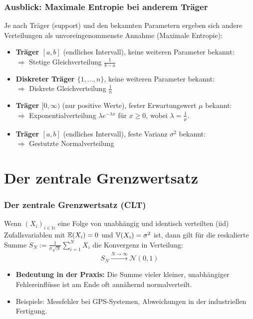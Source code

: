 \begin{frame}
  \frametitle{Ausblick: Maximale Entropie bei anderem Träger}
  Je nach Träger (support) und den bekannten Parametern ergeben sich andere Verteilungen als \alert{unvoreingenommenste Annahme} (Maximale Entropie):
  
  \vspace{0.3cm}
  \begin{itemize}[<+->]
    \item \textbf{Träger $[a,b]$} (endliches Intervall), keine weiteren Parameter bekannt:\\
    $\Rightarrow$ \alert{Stetige Gleichverteilung} $\frac{1}{b-a}$
    
    \vspace{0.2cm}
    \item \textbf{Diskreter Träger $\{1, \dots, n\}$}, keine weiteren Parameter bekannt:\\
    $\Rightarrow$ \alert{Diskrete Gleichverteilung} $\frac{1}{n}$
    
    \vspace{0.2cm}
    \item \textbf{Träger $[0, \infty)$} (nur positive Werte), fester Erwartungswert $\mu$ bekannt:\\
    $\Rightarrow$ \alert{Exponentialverteilung} $\lambda e^{-\lambda x}$ für $x\geq 0$, wobei $\lambda = \frac{1}{\mu}$.
    
    \vspace{0.2cm}
    \item \textbf{Träger $[a,b]$} (endliches Intervall), feste Varianz $\sigma^2$ bekannt:\\
    $\Rightarrow$ \alert{Gestutzte Normalverteilung}
  \end{itemize}
\end{frame}

\section{Der zentrale Grenzwertsatz}

\begin{frame}
  \frametitle{Der zentrale Grenzwertsatz (CLT)}
  \begin{theorem}
    Wenn $(X_i)_{i \in \mathbb{N}}$ eine Folge von unabhängig und identisch verteilten (iid) Zufallsvariablen mit $\mathbb{E}(X_i)=0$ und $\mathbb{V}(X_i)=\sigma^2$ ist, dann gilt für die reskalierte Summe $S_N := \frac{1}{\sigma\sqrt{N}} \sum_{i=1}^N X_i$ die Konvergenz in Verteilung:
    \[ S_N \xrightarrow{N \to \infty} \mathcal{N}(0,1) \]
  \end{theorem}
  \pause
  \begin{itemize}
    \item \textbf{Bedeutung in der Praxis:} Die Summe vieler kleiner, unabhängiger Fehlereinflüsse ist am Ende oft annähernd normalverteilt.
    \item Beispiele: Messfehler bei GPS-Systemen, Abweichungen in der industriellen Fertigung.
  \end{itemize}
\end{frame}

